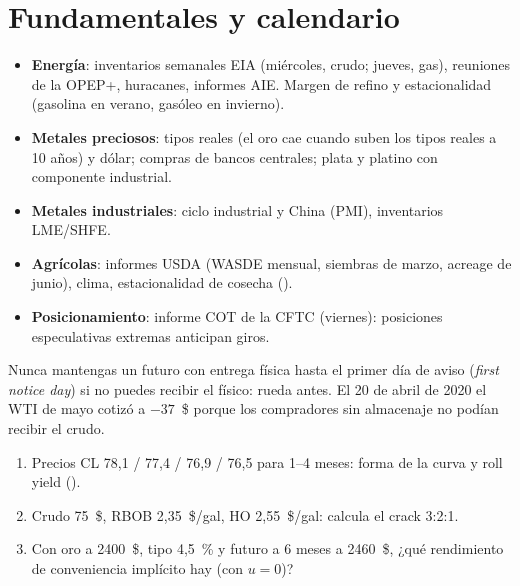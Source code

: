 \section{Fundamentales y calendario}
\begin{itemize}
\item \textbf{Energía}: inventarios semanales EIA (miércoles, crudo; jueves, gas), reuniones de la OPEP+,
  huracanes, informes AIE. Margen de refino y estacionalidad (gasolina en verano, gasóleo en invierno).
\item \textbf{Metales preciosos}: tipos reales (el oro cae cuando suben los tipos reales a 10 años) y
  dólar; compras de bancos centrales; plata y platino con componente industrial.
\item \textbf{Metales industriales}: ciclo industrial y China (PMI), inventarios LME/SHFE.
\item \textbf{Agrícolas}: informes USDA (WASDE mensual, siembras de marzo, acreage de junio), clima,
  estacionalidad de cosecha ().
\item \textbf{Posicionamiento}: informe COT de la CFTC (viernes): posiciones especulativas extremas
  anticipan giros.
\end{itemize}

\begin{practica}
Nunca mantengas un futuro con entrega física hasta el primer día de aviso (\emph{first notice day})
si no puedes recibir el físico: rueda antes. El 20 de abril de 2020 el WTI de mayo cotizó a $-37$~\$
porque los compradores sin almacenaje no podían recibir el crudo.
\end{practica}

\begin{ejercicios}
\begin{enumerate}
\item Precios CL 78,1 / 77,4 / 76,9 / 76,5 para 1--4 meses: forma de la curva y roll yield
  ().
\item Crudo 75~\$, RBOB 2,35~\$/gal, HO 2,55~\$/gal: calcula el crack 3:2:1.
\item Con oro a 2400~\$, tipo 4,5~\% y futuro a 6 meses a 2460~\$, ¿qué rendimiento de conveniencia
  implícito hay (con $u=0$)?
\end{enumerate}
\end{ejercicios}
